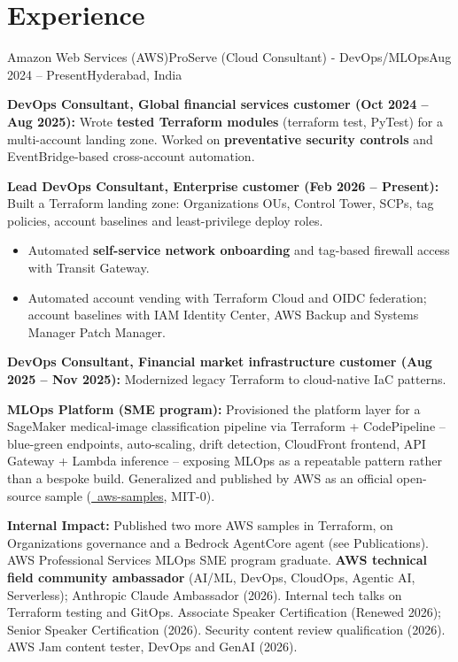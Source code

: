 \section{\textbf{Experience}}
\resumeSubHeadingListStart

\resumeExp
{Amazon Web Services (AWS)}{ProServe (Cloud Consultant) - DevOps/MLOps}{Aug 2024 -- Present}{Hyderabad, India}
\resumeItemListStart
    \item[$\diamond$] \textbf{DevOps Consultant, Global financial services customer (Oct 2024 -- Aug 2025):} Wrote \textbf{tested Terraform modules} (terraform test, PyTest) for a multi-account landing zone. Worked on \textbf{preventative security controls} and EventBridge-based cross-account automation.
    \item[$\diamond$] \textbf{Lead DevOps Consultant, Enterprise customer (Feb 2026 -- Present):} Built a Terraform landing zone: Organizations OUs, Control Tower, SCPs, tag policies, account baselines and least-privilege deploy roles.
    \begin{itemize}[leftmargin=2.5ex, noitemsep, topsep=0pt, labelsep=1.2mm]
        \item[$\circ$] Automated \textbf{self-service network onboarding} and tag-based firewall access with Transit Gateway.
        \item[$\circ$] Automated account vending with Terraform Cloud and OIDC federation; account baselines with IAM Identity Center, AWS Backup and Systems Manager Patch Manager.
    \end{itemize}
    \item[$\diamond$] \textbf{DevOps Consultant, Financial market infrastructure customer (Aug 2025 -- Nov 2025):} Modernized legacy Terraform to cloud-native IaC patterns.
    \item[$\diamond$] \textbf{MLOps Platform (SME program):} Provisioned the platform layer for a SageMaker medical-image classification pipeline via Terraform + CodePipeline -- blue-green endpoints, auto-scaling, drift detection, CloudFront frontend, API Gateway + Lambda inference -- exposing MLOps as a repeatable pattern rather than a bespoke build. Generalized and published by AWS as an official open-source sample (\href{https://github.com/aws-samples/sample-sagemaker-image-classification-mlops}{\faGithub\ aws-samples}, MIT-0).
    \item[$\diamond$] \textbf{Internal Impact:} Published two more AWS samples in Terraform, on Organizations governance and a Bedrock AgentCore agent (see Publications). AWS Professional Services MLOps SME program graduate. \textbf{AWS technical field community ambassador} (AI/ML, DevOps, CloudOps, Agentic AI, Serverless); Anthropic Claude Ambassador (2026). Internal tech talks on Terraform testing and GitOps. Associate Speaker Certification (Renewed 2026); Senior Speaker Certification (2026). Security content review qualification (2026). AWS Jam content tester, DevOps and GenAI (2026).
\resumeItemListEnd

